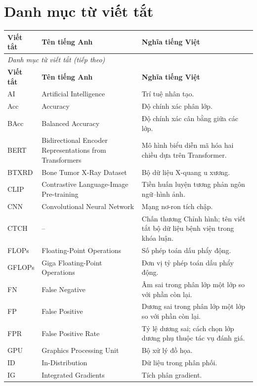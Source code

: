 \chapter*{Danh mục từ viết tắt}
\begingroup
\small
{}
\setlength{\tabcolsep}{4pt}
\renewcommand{\arraystretch}{1.0}
\begin{longtable}{@{}p{}p{}p{}@{}}
\toprule
\textbf{Viết tắt} & \textbf{Tên tiếng Anh} & \textbf{Nghĩa tiếng Việt} \\
\midrule
\endfirsthead
\multicolumn{3}{l}{\textit{Danh mục từ viết tắt (tiếp theo)}}\\
\toprule
\textbf{Viết tắt} & \textbf{Tên tiếng Anh} & \textbf{Nghĩa tiếng Việt} \\
\midrule
\endhead
\bottomrule
\endlastfoot
AI & Artificial Intelligence & Trí tuệ nhân tạo. \\
Acc & Accuracy & Độ chính xác phân lớp. \\
BAcc & Balanced Accuracy & Độ chính xác cân bằng giữa các lớp. \\
BERT & Bidirectional Encoder Representations from Transformers & Mô hình biểu diễn mã hóa hai chiều dựa trên Transformer. \\
BTXRD & Bone Tumor X-Ray Dataset & Bộ dữ liệu X-quang u xương. \\
CLIP & Contrastive Language-Image Pre-training & Tiền huấn luyện tương phản ngôn ngữ--hình ảnh. \\
CNN & Convolutional Neural Network & Mạng nơ-ron tích chập. \\
CTCH & -- & Chấn thương Chỉnh hình; tên viết tắt bộ dữ liệu bệnh viện trong khóa luận. \\
FLOPs & Floating-Point Operations & Số phép toán dấu phẩy động. \\
GFLOPs & Giga Floating-Point Operations & Đơn vị tỷ phép toán dấu phẩy động. \\
FN & False Negative & Âm sai trong phân lớp một lớp so với phần còn lại. \\
FP & False Positive & Dương sai trong phân lớp một lớp so với phần còn lại. \\
FPR & False Positive Rate & Tỷ lệ dương sai; cách chọn lớp dương phụ thuộc tác vụ đánh giá. \\
GPU & Graphics Processing Unit & Bộ xử lý đồ họa. \\
ID & In-Distribution & Dữ liệu trong phân phối. \\
IG & Integrated Gradients & Tích phân gradient. \\

\end{longtable}
